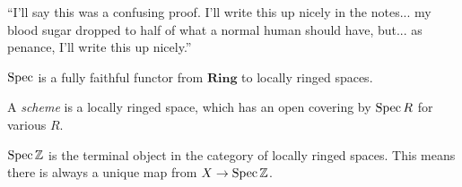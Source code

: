 {\color{amethyst} ``I'll say this was a confusing proof. I'll write this up nicely in the notes... my blood sugar dropped to half of what a normal human should have, but... as penance, I'll write this up nicely.''}

\begin{theorem} \label{thm:spectrum_ring_to_locally_ringed_spaces_functor}
    $\operatorname{Spec}$ is a fully faithful functor from $\mathbf{Ring}$ to locally ringed spaces.
\end{theorem}

\begin{definition} \label{pre_defn:scheme}
    A \textit{scheme} is a locally ringed space, which has an open covering by $\operatorname{Spec} R$ for various $R$.
\end{definition}

\begin{corollary} \label{cor:spectrum_of_integers_is_terminal_object}
    $\operatorname{Spec} \mathbb Z$ is the terminal object in the category of locally ringed spaces. This means there is always a unique map from $X \to \operatorname{Spec} \mathbb Z$.
\end{corollary}